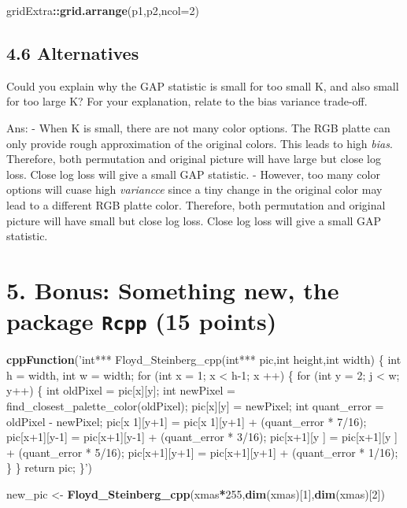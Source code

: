 \documentclass[]{article}
\newenvironment{Shaded}{\begin{snugshade}}{\end{snugshade}}
\newcommand{\DataTypeTok}[1]{\textcolor[rgb]{0.13,0.29,0.53}{#1}}
\newcommand{\DecValTok}[1]{\textcolor[rgb]{0.00,0.00,0.81}{#1}}
\newcommand{\KeywordTok}[1]{\textcolor[rgb]{0.13,0.29,0.53}{\textbf{#1}}}
\newcommand{\NormalTok}[1]{#1}
\newcommand{\OperatorTok}[1]{\textcolor[rgb]{0.81,0.36,0.00}{\textbf{#1}}}
\newcommand{\StringTok}[1]{\textcolor[rgb]{0.31,0.60,0.02}{#1}}
\begin{document}
\begin{Shaded}
\begin{Highlighting}[]
\NormalTok{gridExtra}\OperatorTok{::}\KeywordTok{grid.arrange}\NormalTok{(p1,p2,}\DataTypeTok{ncol=}\DecValTok{2}\NormalTok{)}
\end{Highlighting}
\end{Shaded}

\hypertarget{alternatives}{%
\subsection{4.6 Alternatives}\label{alternatives}}

Could you explain why the GAP statistic is small for too small K, and
also small for too large K? For your explanation, relate to the bias
variance trade-off.

Ans: - When K is small, there are not many color options. The RGB platte
can only provide rough approximation of the original colors. This leads
to high \emph{bias}. Therefore, both permutation and original picture
will have large but close log loss. Close log loss will give a small GAP
statistic. - However, too many color options will cuase high
\emph{variancce} since a tiny change in the original color may lead to a
different RGB platte color. Therefore, both permutation and original
picture will have small but close log loss. Close log loss will give a
small GAP statistic.

\clearpage

\hypertarget{bonus-something-new-the-package-rcpp-15-points}{%
\section{\texorpdfstring{5. Bonus: Something new, the package
\texttt{Rcpp} (15
points)}{5. Bonus: Something new, the package Rcpp (15 points)}}\label{bonus-something-new-the-package-rcpp-15-points}}

\begin{Shaded}
\begin{Highlighting}[]
\KeywordTok{cppFunction}\NormalTok{(}\StringTok{'int***  Floyd_Steinberg_cpp(int*** pic,int height,int width) \{}
\StringTok{  int h = width, int w = width;}
\StringTok{  for (int x = 1; x < h-1; x ++) \{}
\StringTok{      for (int y = 2; j < w; y++) \{}
\StringTok{          int oldPixel = pic[x][y];}
\StringTok{          int newPixel = find_closest_palette_color(oldPixel);}
\StringTok{          pic[x][y] = newPixel;}
\StringTok{          int quant_error = oldPixel - newPixel;}
\StringTok{          pic[x 1][y+1] = pic[x 1][y+1] + (quant_error * 7/16);}
\StringTok{          pic[x+1][y-1] = pic[x+1][y-1] + (quant_error * 3/16);}
\StringTok{          pic[x+1][y  ] = pic[x+1][y  ] + (quant_error * 5/16);}
\StringTok{          pic[x+1][y+1] = pic[x+1][y+1] + (quant_error * 1/16);}
\StringTok{      \}}
\StringTok{  \}}
\StringTok{  return pic;}
\StringTok{\}'}\NormalTok{)}


\NormalTok{ new_pic <-}\StringTok{ }\KeywordTok{Floyd_Steinberg_cpp}\NormalTok{(xmas}\OperatorTok{*}\DecValTok{255}\NormalTok{,}\KeywordTok{dim}\NormalTok{(xmas)[}\DecValTok{1}\NormalTok{],}\KeywordTok{dim}\NormalTok{(xmas)[}\DecValTok{2}\NormalTok{])}
\end{Highlighting}
\end{Shaded}
\end{document}
